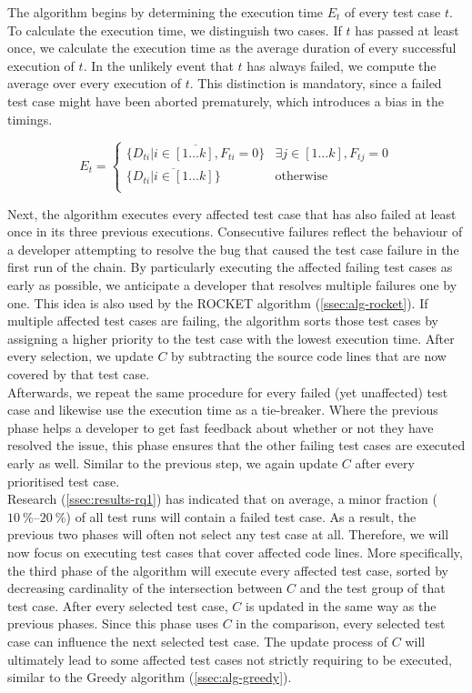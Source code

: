 \noindent The algorithm begins by determining the execution time $E_t$ of every test case $t$. To calculate the execution time, we distinguish two cases. If $t$ has passed at least once, we calculate the execution time as the average duration of every successful execution of $t$. In the unlikely event that $t$ has always failed, we compute the average over every execution of $t$. This distinction is mandatory, since a failed test case might have been aborted prematurely, which introduces a bias in the timings.

\[
	E_t = \left.
	\begin{cases}
		\overline{\{D_{ti} \vert i \in [1 \dots k], F_{ti} = 0\}} & \exists j \in [1 \dots k], F_{tj} = 0 \\
		\overline{\{D_{ti} \vert i \in [1 \dots k]\}} & \text{otherwise} \\
	\end{cases}
	\right.
\]

\noindent Next, the algorithm executes every affected test case that has also failed at least once in its three previous executions. Consecutive failures reflect the behaviour of a developer attempting to resolve the bug that caused the test case failure in the first run of the chain. By particularly executing the affected failing test cases as early as possible, we anticipate a developer that resolves multiple failures one by one. This idea is also used by the ROCKET algorithm (\cref{ssec:alg-rocket}). If multiple affected test cases are failing, the algorithm sorts those test cases by assigning a higher priority to the test case with the lowest execution time. After every selection, we update $C$ by subtracting the source code lines that are now covered by that test case.\\

\noindent Afterwards, we repeat the same procedure for every failed (yet unaffected) test case and likewise use the execution time as a tie-breaker. Where the previous phase helps a developer to get fast feedback about whether or not they have resolved the issue, this phase ensures that the other failing test cases are executed early as well. Similar to the previous step, we again update $C$ after every prioritised test case.\\

\noindent Research (\cref{ssec:results-rq1}) has indicated that on average, a minor fraction ($\SIrange{10}{20}{\percent}$) of all test runs will contain a failed test case. As a result, the previous two phases will often not select any test case at all. Therefore, we will now focus on executing test cases that cover affected code lines. More specifically, the third phase of the algorithm will execute every affected test case, sorted by decreasing cardinality of the intersection between $C$ and the test group of that test case. After every selected test case, $C$ is updated in the same way as the previous phases. Since this phase uses $C$ in the comparison, every selected test case can influence the next selected test case. The update process of $C$ will ultimately lead to some affected test cases not strictly requiring to be executed, similar to the Greedy algorithm (\cref{ssec:alg-greedy}).\\

